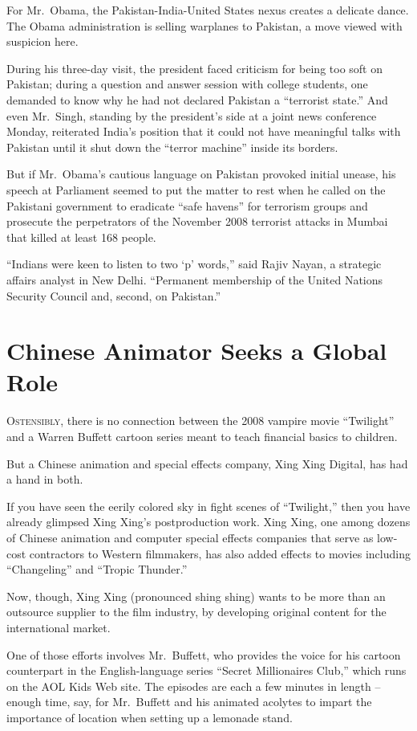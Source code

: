﻿\documentclass[12pt]{article}
\begin{document}
For Mr.~Obama, the Pakistan-India-United States nexus creates a delicate dance. The Obama
administration is selling warplanes to Pakistan, a move viewed with suspicion here.

During his three-day visit, the president faced criticism for being too soft on Pakistan; during a
question and answer session with college students, one demanded to know why he had not declared
Pakistan a ``terrorist state.'' And even Mr.~Singh, standing by the president's side at a joint news
conference Monday, reiterated India's position that it could not have meaningful talks with Pakistan
until it shut down the ``terror machine'' inside its borders.

But if Mr.~Obama's cautious language on Pakistan provoked initial unease, his speech at Parliament
seemed to put the matter to rest when he called on the Pakistani government to eradicate ``safe
havens'' for terrorism groups and prosecute the perpetrators of the November 2008 terrorist attacks
in Mumbai that killed at least 168 people.

``Indians were keen to listen to two `p' words,'' said Rajiv Nayan, a strategic affairs analyst in
New Delhi. ``Permanent membership of the United Nations Security Council and, second, on Pakistan.''

\section{Chinese Animator Seeks a Global Role}

\lettrine{O}{stensibly}, there is no connection between the 2008 vampire
movie ``Twilight'' and a Warren Buffett cartoon series meant to teach financial basics to children.

But a Chinese animation and special effects company, Xing Xing Digital, has had a hand in both.

If you have seen the eerily colored sky in fight scenes of ``Twilight,'' then you have already
glimpsed Xing Xing's postproduction work. Xing Xing, one among dozens of Chinese animation and
computer special effects companies that serve as low-cost contractors to Western filmmakers, has
also added effects to movies including ``Changeling'' and ``Tropic Thunder.''

Now, though, Xing Xing (pronounced shing shing) wants to be more than an outsource supplier to the
film industry, by developing original content for the international market.

One of those efforts involves Mr.~Buffett, who provides the voice for his cartoon counterpart in the
English-language series ``Secret Millionaires Club,'' which runs on the AOL Kids Web site. The
episodes are each a few minutes in length -- enough time, say, for Mr.~Buffett and his animated
acolytes to impart the importance of location when setting up a lemonade stand.
\end{document}
